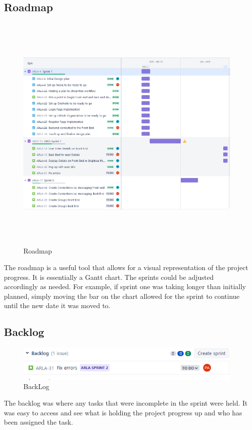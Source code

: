 \subsection{Roadmap}
\begin{figure}[h]
    \centering
    \includegraphics[width=15cm, height=12cm]{img/Roadmap.png}
    \caption{Roadmap}
    \label{fig:my_label}
\end{figure}

The roadmap is a useful tool that allows for a visual representation of the project progress. It is essentially a Gantt chart. The sprints could be adjusted accordingly as needed. For example, if sprint one was taking longer than initially planned, simply moving the bar on the chart allowed for the sprint to continue until the new date it was moved to. 

\subsection{Backlog}
\begin{figure}[h]
    \centering
    \includegraphics{img/Backlog.png}
    \caption{BackLog}
    \label{fig:my_label}
\end{figure}
The backlog was where any tasks that were incomplete in the sprint were held. It was easy to access and see what is holding the project progress up and who has been assigned the task. 

